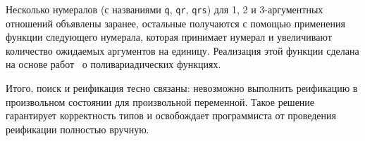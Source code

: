 \begin{comment}

The types of \mbox{$a_1\dots a_n$} are inferred from the types of \mbox{$l_1\dots l_n$} and
have the form

\begin{lstlisting}
   $(\alpha,\;\beta)$ reified stream
\end{lstlisting}

\noindent where the type \lstinline|reified|, in turn, is

\begin{lstlisting}
   type ($\alpha$, $\beta$) reified = $<\;$prj : $\alpha$; reify : (helper -> $\{\alpha,\;\beta\}$ -> $\beta$) -> $\beta>$
\end{lstlisting}

Two methods of this type can be used to perform two different styles of reification: first, a value without
free variables can be returned as is (using the method \lstinline|prj| which checks that in the value of
interest no free variables occur, and raises an exception otherwise). If the value contains some free
variables, it has to be properly injected into the logic domain~--- this is what \lstinline|reify| stands
for. It takes as an argument a type-specific tagging function, constructed using generic
primitives described in the previous section.

In other words a user-defined handler takes streams of reified answers for all variables supplied to the top-level
goal. All streams $a_i$ contain coherent elements, so they all have the same length and $n$-th elements of all
streams correspond to the $n$-th answer, produced by the goal $G$.
\end{comment}


Несколько нумералов (с названиями \lstinline|q|, \lstinline|qr|, \lstinline|qrs|) для 1, 2 и 3-аргументных отношений объявлены заранее,
остальные получаются с помощью применения функции следующего нумерала, которая принимает нумерал и увеличивают количество ожидаемых аргументов на единицу.
Реализация этой функции сделана на основе работ~\cite{Unparsing, DoWeNeed} о поливариадических функциях.


Итого, поиск и реификация тесно связаны: невозможно выполнить реификацию в произвольном состоянии для произвольной переменной.
Такое решение гарантирует корректность типов и освобождает программиста от проведения реификации полностью вручную.

